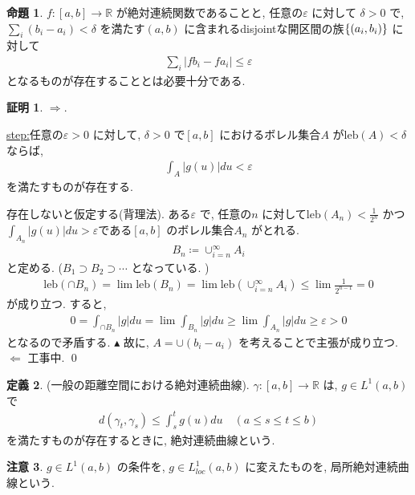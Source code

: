 \documentclass[10pt, fleqn, label-section=none]{bxjsarticle}
\theoremstyle{definition}
\newtheorem{dfn}{定義}[section]
\newtheorem{prop}[dfn]{命題}
\newtheorem*{pf*}{証明}
\newtheorem{remark}[dfn]{注意}
\newcommand{\veps}{\varepsilon}
\newcommand{\cbra}[1]{\mleft\{#1\mright\}}
\newcommand{\abs}[1]{\left|#1\right|}
\newcommand{\naraba}{\Rightarrow}
\newcommand{\gyaku}{\Leftarrow}
\renewcommand{\;}{\, ; \,}
\newenvironment{claim}[1]{\par\noindent\underline{step:}\space#1}{}
\newenvironment{claimproof}[1]{\par\noindent{($\because$)}\space#1}{\hfill $\blacktriangle $}
\begin{document}
\begin{prop}$f: [a,b] \rightarrow \mathbb R$ が絶対連続関数であることと, 
任意の$\veps$ に対して $\delta >0$ で, $\sum_i (b_i - a_i) < \delta$ を満たす$(a,b)$ に含まれるdisjointな開区間の族$\cbra{(a_i, b_i)}$ に対して
\begin{align*} \sum_i \abs{f b_i - f a_i} \leq \veps \end{align*}
となるものが存在することとは必要十分である.
\end{prop}
\begin{pf*}
$\naraba.$ 
\begin{claim}
任意の$\veps >0$ に対して, $\delta > 0 $ で$[a, b]$ におけるボレル集合$A$ が$\textrm{leb}(A) < \delta$ ならば, 
\begin{align*} \int_A \abs{g(u)} du < \veps \end{align*}
を満たすものが存在する. 
\end{claim}
\begin{claimproof}
存在しないと仮定する(背理法). ある$\veps$ で, 任意の$n$ に対して$\textrm{leb}(A_n) < \frac{1}{2^n}$ かつ$\int_{A_n} \abs{g(u)} du > \veps$である$[a,b]$ のボレル集合$A_n$ がとれる. 
\begin{align*} B_n \coloneqq \cup_{i = n}^\infty A_i \end{align*}
と定める. ($B_1 \supset B_2 \supset \cdots $ となっている. )
\begin{align*}  \textrm{leb}(\cap B_n)   = \lim \textrm{leb}(B_n) = \lim  \textrm{leb}(\cup_{i = n}^\infty A_i) \leq  \lim \frac{1}{2^{n-1}} = 0 \end{align*}
が成り立つ. すると, 
\begin{align*} 0 = \int_{\cap B_n} \abs g du = \lim \int_{B_n} \abs g du \geq \lim \int_{A_n} \abs g du \geq \veps > 0\end{align*}
となるので矛盾する. 
\end{claimproof}
故に, $A = \cup (b_i - a_i)$ を考えることで主張が成り立つ. $\gyaku$ 工事中. 
\qed
\end{pf*}

\begin{dfn}(一般の距離空間における絶対連続曲線). $\gamma : [a, b] \rightarrow \mathbb R$ は, 
$g \in L^1(a,b)$ で
\begin{align*} d(\gamma_t, \gamma_s) \leq \int_s^t g(u) du \quad (a \leq s \leq t \leq b)\end{align*}
を満たすものが存在するときに, 絶対連続曲線という. 
\end{dfn}

\begin{remark}
$g \in L^1(a,b)$ の条件を, $g \in L^1_{loc} (a, b)$ に変えたものを, 局所絶対連続曲線という. 
\end{remark}
\end{document}
